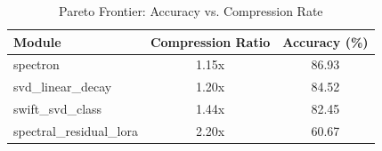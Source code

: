 \begin{table}[ht]
\centering
\small
\caption{Pareto Frontier: Accuracy vs. Compression Rate}
\begin{tabular}{lcc}
\toprule
Module & Compression Ratio & Accuracy (\%) \\
\midrule
spectron & 1.15x & 86.93 \\
svd\_linear\_decay & 1.20x & 84.52 \\
swift\_svd\_class & 1.44x & 82.45 \\
spectral\_residual\_lora & 2.20x & 60.67 \\
\bottomrule
\end{tabular}
\end{table}
